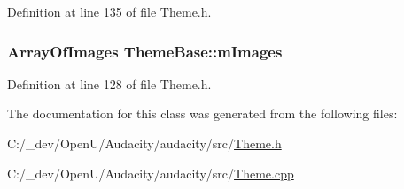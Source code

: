 Definition at line 135 of file Theme.\+h.

\subsubsection[{\texorpdfstring{m\+Images}{mImages}}]{\setlength{\rightskip}{0pt plus 5cm}Array\+Of\+Images Theme\+Base\+::m\+Images\hspace{0.3cm}{\ttfamily [protected]}}\hypertarget{class_theme_base_a272dd7c09b9eeb4472fed53c6d67af8d}{}\label{class_theme_base_a272dd7c09b9eeb4472fed53c6d67af8d}


Definition at line 128 of file Theme.\+h.



The documentation for this class was generated from the following files\+:\begin{DoxyCompactItemize}
\item 
C\+:/\+\_\+dev/\+Open\+U/\+Audacity/audacity/src/\hyperlink{_theme_8h}{Theme.\+h}\item 
C\+:/\+\_\+dev/\+Open\+U/\+Audacity/audacity/src/\hyperlink{_theme_8cpp}{Theme.\+cpp}\end{DoxyCompactItemize}

